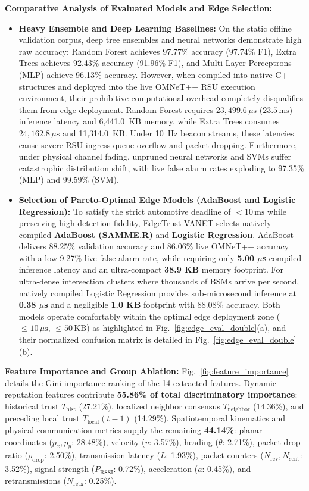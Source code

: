 \documentclass[conference]{IEEEtran}
\begin{document}
\textbf{Comparative Analysis of Evaluated Models and Edge Selection:}
\begin{itemize}
    \item \textbf{Heavy Ensemble and Deep Learning Baselines:} On the static offline validation corpus, deep tree ensembles and neural networks demonstrate high raw accuracy: Random Forest achieves 97.77\% accuracy (97.74\% F1), Extra Trees achieves 92.43\% accuracy (91.96\% F1), and Multi-Layer Perceptrons (MLP) achieve 96.13\% accuracy. However, when compiled into native C++ structures and deployed into the live OMNeT++ RSU execution environment, their prohibitive computational overhead completely disqualifies them from edge deployment. Random Forest requires $23,499.6\,\mu\text{s}$ ($23.5\,\text{ms}$) inference latency and 6,441.0~KB memory, while Extra Trees consumes $24,162.8\,\mu\text{s}$ and 11,314.0~KB. Under 10~Hz beacon streams, these latencies cause severe RSU ingress queue overflow and packet dropping. Furthermore, under physical channel fading, unpruned neural networks and SVMs suffer catastrophic distribution shift, with live false alarm rates exploding to 97.35\% (MLP) and 99.59\% (SVM).
    \item \textbf{Selection of Pareto-Optimal Edge Models (AdaBoost and Logistic Regression):} To satisfy the strict automotive deadline of $<10\,\text{ms}$ while preserving high detection fidelity, EdgeTrust-VANET selects natively compiled \textbf{AdaBoost (SAMME.R)} and \textbf{Logistic Regression}. AdaBoost delivers 88.25\% validation accuracy and 86.06\% live OMNeT++ accuracy with a low 9.27\% live false alarm rate, while requiring only \textbf{5.00 $\mu$s} compiled inference latency and an ultra-compact \textbf{38.9 KB} memory footprint. For ultra-dense intersection clusters where thousands of BSMs arrive per second, natively compiled Logistic Regression provides sub-microsecond inference at \textbf{0.38 $\mu$s} and a negligible \textbf{1.0 KB} footprint with 88.08\% accuracy. Both models operate comfortably within the optimal edge deployment zone ($\le 10\,\mu\text{s}$, $\le 50\,\text{KB}$) as highlighted in Fig.~\ref{fig:edge_eval_double}(a), and their normalized confusion matrix is detailed in Fig.~\ref{fig:edge_eval_double}(b).
\end{itemize}

\textbf{Feature Importance and Group Ablation:}
Fig.~\ref{fig:feature_importance} details the Gini importance ranking of the 14 extracted features. Dynamic reputation features contribute \textbf{55.86\% of total discriminatory importance}: historical trust $T_{\text{hist}}$ (27.21\%), localized neighbor consensus $\bar{T}_{\text{neighbor}}$ (14.36\%), and preceding local trust $T_{\text{local}}(t-1)$ (14.29\%). Spatiotemporal kinematics and physical communication metrics supply the remaining \textbf{44.14\%}: planar coordinates ($p_x, p_y$: 28.48\%), velocity ($v$: 3.57\%), heading ($\theta$: 2.71\%), packet drop ratio ($\rho_{\text{drop}}$: 2.50\%), transmission latency ($L$: 1.93\%), packet counters ($N_{\text{rcv}}, N_{\text{sent}}$: 3.52\%), signal strength ($P_{\text{RSSI}}$: 0.72\%), acceleration ($a$: 0.45\%), and retransmissions ($N_{\text{retx}}$: 0.25\%).
\end{document}
